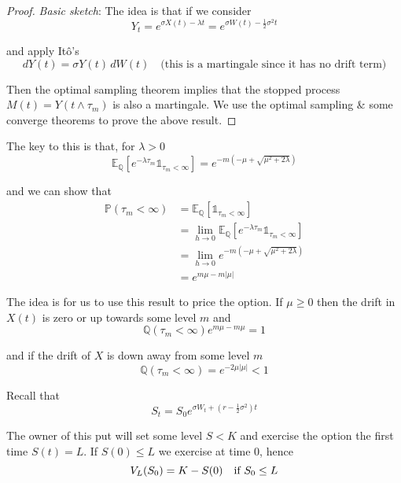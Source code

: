 \documentclass[12pt]{article}
\newlength\tindent
\renewcommand{\indent}{\hspace*{\tindent}}
\renewcommand{\P}{\mathbb P}
\newcommand{\Q}{\mathbb Q}
\newcommand{\E}{\mathbb E}
\begin{document}
\begin{proof} {\em Basic sketch}: The idea is that if we consider
\begin{equation*}
	Y_t = e^{\sigma X(t) - \lambda t} = e^{\sigma W(t) - \frac{1}{2}\sigma^2 t}
\end{equation*}

and apply It\^{o}'s
\begin{equation*}
	dY(t) = \sigma Y(t)\,dW(t) \quad \text{(this is a martingale since it has no drift term)}
\end{equation*}

\indent Then the optimal sampling theorem implies that the stopped process $M(t) = Y(t \land \tau_m)$ is also a martingale. We use the optimal sampling \& some converge theorems to prove the above result.
\end{proof}

The key to this is that, for $\lambda > 0$
\begin{equation*}
	\E_\Q \left[ e^{-\lambda \tau_m} \mathds 1_{\tau_m < \infty} \right] = e^{-m(-\mu + \sqrt{\mu^2 + 2\lambda})}
\end{equation*}

and we can show that
\begin{align*}
	\P (\tau_m < \infty) &= \E_\Q \left[ \mathds 1_{\tau_m < \infty} \right] \\
	&= \lim_{h \to 0} \E_\Q \left[ e^{-\lambda \tau_m} \mathds 1_{\tau_m < \infty} \right] \\ 
	&= \lim_{h \to 0} e^{-m(-\mu + \sqrt{\mu^2 + 2\lambda})} \\
	&= e^{m\mu - m|\mu|}
\end{align*}

\indent The idea is for us to use this result to price the option. If $\mu \geq 0$ then the drift in $X(t)$ is zero or up towards some level $m$ and
\begin{equation*}
	\Q ( \tau_m < \infty ) e^{m \mu - m \mu} = 1
\end{equation*}

and if the drift of $X$ is down away from some level $m$
\begin{equation*}
	\Q ( \tau_m < \infty ) = e^{-2\mu|\mu|} < 1
\end{equation*}

Recall that 
\begin{equation*}
	S_t = S_0 e^{\sigma W_t + (r - \frac{1}{2}\sigma^2)t}
\end{equation*}

\indent The owner of this put will set some level $S < K$ and exercise the option the first time $S(t) = L$. If $S(0) \leq L$ we exercise at time 0, hence
\begin{equation*}
	V_L(S_0) = K - S(0) \quad \text{if } S_0 \leq L \\
\end{equation*}
\end{document}
